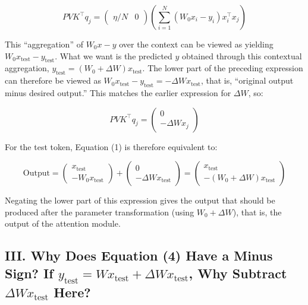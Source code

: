 \[
PVK^\top q_j=\begin{pmatrix}\eta/N&0\end{pmatrix}\left(\sum_{i=1}^{N}(W_0x_i-y_i)x_i^\top x_j\right)
\]

This ``aggregation'' of \(W_0x-y\) over the context can be viewed as yielding \(W_0x_{\mathrm{test}}-y_{\mathrm{test}}\). What we want is the predicted \(y\) obtained through this contextual aggregation, \(y_{\mathrm{test}}=(W_0+\Delta W)x_{\mathrm{test}}\). The lower part of the preceding expression can therefore be viewed as \(W_0x_{\mathrm{test}}-y_{\mathrm{test}}=-\Delta W x_{\mathrm{test}}\), that is, ``original output minus desired output.'' This matches the earlier expression for \(\Delta W\), so:

\[
PVK^\top q_j=\begin{pmatrix}0\\-\Delta W x_j\end{pmatrix}
\]

For the test token, Equation (1) is therefore equivalent to:

\[
\mathrm{Output}
=\begin{pmatrix}x_{\mathrm{test}}\\-W_0x_{\mathrm{test}}\end{pmatrix}
+\begin{pmatrix}0\\-\Delta W x_{\mathrm{test}}\end{pmatrix}
=\begin{pmatrix}x_{\mathrm{test}}\\-(W_0+\Delta W)x_{\mathrm{test}}\end{pmatrix}
\tag{4}
\]

Negating the lower part of this expression gives the output that should be produced after the parameter transformation (using \(W_0+\Delta W\)), that is, the output of the attention module.

\hypertarget{iii.-why-does-equation-4-have-a-minus-sign-if-y_mathrmtestwx_mathrmtestdelta-wx_mathrmtest-why-subtract-delta-wx_mathrmtest-here}{%
\subsection{\texorpdfstring{III. Why Does Equation (4) Have a Minus Sign? If \(y_{\mathrm{test}}=Wx_{\mathrm{test}}+\Delta Wx_{\mathrm{test}}\), Why Subtract \(\Delta Wx_{\mathrm{test}}\) Here?}{III. Why Does Equation (4) Have a Minus Sign? If y\_\{\textbackslash mathrm\{test\}\}=Wx\_\{\textbackslash mathrm\{test\}\}+\textbackslash Delta Wx\_\{\textbackslash mathrm\{test\}\}, Why Subtract \textbackslash Delta Wx\_\{\textbackslash mathrm\{test\}\} Here?}}\label{iii.-why-does-equation-4-have-a-minus-sign-if-y_mathrmtestwx_mathrmtestdelta-wx_mathrmtest-why-subtract-delta-wx_mathrmtest-here}}

